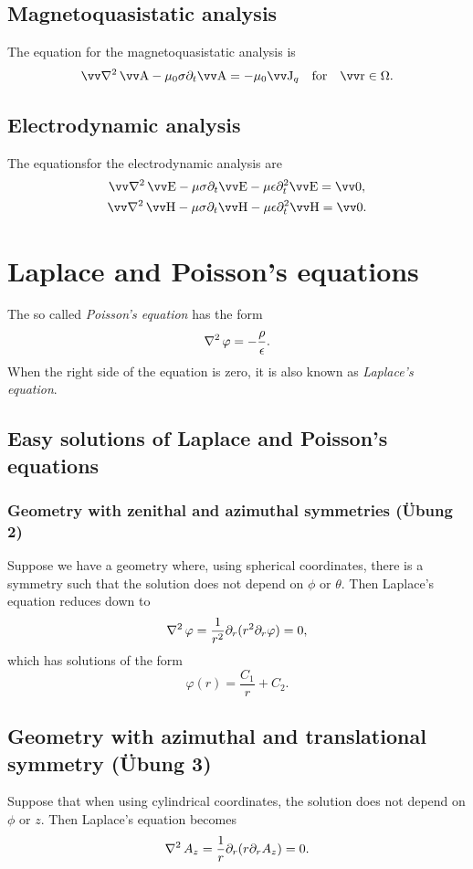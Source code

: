 \documentclass[margin=normal]{tex/hsrzf}
\theoremstyle{elmagzf}
\begin{document}
\subsection{Magnetoquasistatic analysis}
The equation for the magnetoquasistatic analysis is
\begin{equation}
  \vlaplacian \vec{A} - \mu_0 \sigma \partial_t \vec{A}
    = -\mu_0 \vec{J}_q \quad\text{for}\quad \vec{r} \in \Omega.
\end{equation}

\subsection{Electrodynamic analysis}
The equationsfor the electrodynamic analysis are
\begin{subequations}
  \begin{gather}
    \vlaplacian \vec{E}
      - \mu \sigma \partial_t \vec{E}
      - \mu \epsilon \partial^2_t \vec{E} = \vec{0}, \\
    \vlaplacian \vec{H}
      - \mu \sigma \partial_t \vec{H}
      - \mu \epsilon \partial^2_t \vec{H} = \vec{0}.
  \end{gather}
\end{subequations}

\section{Laplace and Poisson's equations} \label{sec:poisson}

The so called \emph{Poisson's equation} has the form
\[
  \operatorname{\nabla^2} \varphi = - \frac{\rho}{\epsilon}.
\]
When the right side of the equation is zero, it is also known as \emph{Laplace's
equation}.

\subsection{Easy solutions of Laplace and Poisson's equations}

\subsubsection{Geometry with zenithal and azimuthal symmetries (\"Ubung 2)}

Suppose we have a geometry where, using spherical coordinates, there is a
symmetry such that the solution does not depend on \(\phi\) or \(\theta\).
Then Laplace's equation reduces down to
\[
  \operatorname{\nabla^2} \varphi = \frac{1}{r^2} \partial_r ( r^2 \partial_r \varphi) = 0,
\]
which has solutions of the form
\[
  \varphi(r) = \frac{C_1}{r} + C_2.
\]

\subsection{Geometry with azimuthal and translational symmetry (\"Ubung 3)}

Suppose that when using cylindrical coordinates, the solution does not depend
on \(\phi\) or \(z\). Then Laplace's equation becomes
\[
  \operatorname{\nabla^2} A_z = \frac{1}{r} \partial_r (r \partial_r A_z) = 0.
\]
\end{document}
